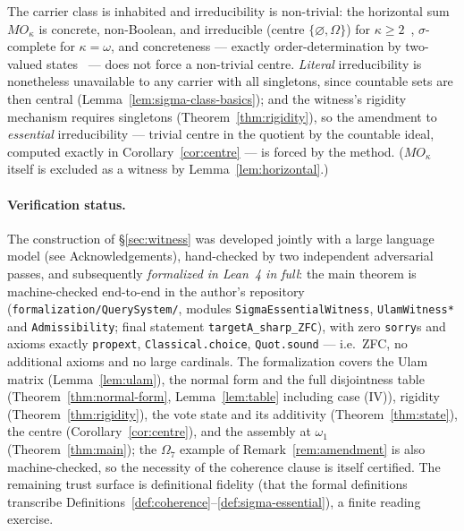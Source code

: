\begin{remark}\label{rem:offcenter}
The carrier class is inhabited and irreducibility is non-trivial: the horizontal
sum $MO_\kappa$ is concrete, non-Boolean, and irreducible (centre
$\{\varnothing,\Omega\}$) for $\kappa\geq 2$~\cite{Kalmbach1983},
$\sigma$-complete for $\kappa=\omega$, and concreteness --- exactly
order-determination by two-valued states~\cite{Gudder1969,Harding2004} --- does
not force a non-trivial centre. \emph{Literal} irreducibility is nonetheless
unavailable to any carrier with all singletons, since countable sets are then
central (Lemma~\ref{lem:sigma-class-basics}); and the witness's rigidity
mechanism requires singletons (Theorem~\ref{thm:rigidity}), so the amendment to
\emph{essential} irreducibility --- trivial centre in the quotient by the
countable ideal, computed exactly in Corollary~\ref{cor:centre} --- is forced by
the method. ($MO_\kappa$ itself is excluded as a witness by
Lemma~\ref{lem:horizontal}.)
\end{remark}

\paragraph{Verification status.}
The construction of \S\ref{sec:witness} was developed jointly with a large
language model (see Acknowledgements), hand-checked by two independent
adversarial passes, and subsequently \emph{formalized in Lean~4 in full}: the
main theorem is machine-checked end-to-end in the author's repository
(\texttt{formalization/QuerySystem/}, modules \texttt{SigmaEssentialWitness},
\texttt{UlamWitness*} and \texttt{Admissibility}; final statement
\texttt{targetA\_sharp\_ZFC}), with zero \texttt{sorry}s and axioms exactly
\texttt{propext},
\texttt{Classical.choice}, \texttt{Quot.sound} --- i.e.\ ZFC, no additional
axioms and no large cardinals. The formalization covers the Ulam matrix
(Lemma~\ref{lem:ulam}), the normal form and the full disjointness table
(Theorem~\ref{thm:normal-form}, Lemma~\ref{lem:table} including case (IV)),
rigidity (Theorem~\ref{thm:rigidity}), the vote state and its additivity
(Theorem~\ref{thm:state}), the centre (Corollary~\ref{cor:centre}), and the
assembly at $\omega_1$ (Theorem~\ref{thm:main}); the $\Omega_7$ example of
Remark~\ref{rem:amendment} is also machine-checked, so the necessity of the
coherence clause is itself certified. The remaining trust surface is
definitional fidelity (that the formal definitions transcribe
Definitions~\ref{def:coherence}--\ref{def:sigma-essential}), a finite reading
exercise.


